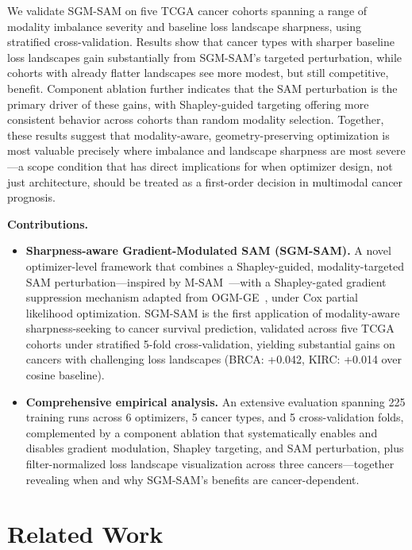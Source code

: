 \documentclass[runningheads]{llncs}
\begin{document}
We validate SGM-SAM on five TCGA cancer cohorts spanning a range of
modality imbalance severity and baseline loss landscape sharpness,
using stratified cross-validation. Results show that cancer types
with sharper baseline loss landscapes gain substantially from
SGM-SAM's targeted perturbation, while cohorts with already flatter
landscapes see more modest, but still competitive, benefit. Component
ablation further indicates that the SAM perturbation is the primary
driver of these gains, with Shapley-guided targeting offering more
consistent behavior across cohorts than random modality selection.
Together, these results suggest that modality-aware,
geometry-preserving optimization is most valuable precisely where
imbalance and landscape sharpness are most severe---a scope condition
that has direct implications for when optimizer design, not just
architecture, should be treated as a first-order decision in
multimodal cancer prognosis.

\textbf{Contributions.}
\begin{itemize}
    \item \textbf{Sharpness-aware Gradient-Modulated SAM (SGM-SAM).}
    A novel optimizer-level framework that combines a
    Shapley-guided, modality-targeted SAM
    perturbation---inspired by M-SAM~\cite{rajoli2025msam}---with
    a Shapley-gated gradient suppression mechanism adapted from
    OGM-GE~\cite{peng2022ogm}, under Cox partial likelihood
    optimization. SGM-SAM is the first application of
    modality-aware sharpness-seeking to cancer survival prediction,
    validated across five TCGA cohorts under stratified 5-fold
    cross-validation, yielding substantial gains on cancers with
    challenging loss landscapes (BRCA: +0.042, KIRC: +0.014 over
    cosine baseline).

    \item \textbf{Comprehensive empirical analysis.}
    An extensive evaluation spanning 225 training runs
    across 6 optimizers, 5 cancer types, and 5 cross-validation
    folds, complemented by a component ablation that systematically
    enables and disables gradient modulation, Shapley targeting,
    and SAM perturbation, plus filter-normalized loss landscape
    visualization across three cancers---together revealing when
    and why SGM-SAM's benefits are cancer-dependent.
\end{itemize}

\section{Related Work}
\end{document}
